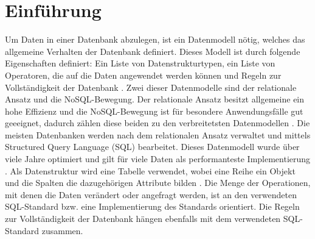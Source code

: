 
\chapter{Einführung} %

\label{Kaptiel1} %


\newcommand{\keyword}[1]{\textit{#1}}
\newcommand{\tabhead}[1]{\textbf{#1}}
\newcommand{\code}[1]{\texttt{#1}}
\newcommand{\file}[1]{\texttt{\bfseries#1}}
\newcommand{\option}[1]{\texttt{\itshape#1}}

Um Daten in einer Datenbank abzulegen, ist ein Datenmodell nötig, welches das allgemeine Verhalten der Datenbank definiert. Dieses Modell ist durch folgende Eigenschaften definiert: Ein Liste von Datenstrukturtypen, ein Liste von Operatoren, die auf die Daten angewendet werden können und Regeln zur Vollständigkeit der Datenbank \parencite{codd1981data}. Zwei dieser Datenmodelle sind der relationale Ansatz und die NoSQL-Bewegung. Der relationale Ansatz besitzt allgemeine ein hohe Effizienz und die NoSQL-Bewegung ist für besondere Anwendungsfälle gut geeeignet, dadurch zählen diese beiden zu den verbreitetsten Datenmodellen \parencite{vicknair2010comparison}. \newline
Die meisten Datenbanken werden nach dem relationalen Ansatz verwaltet und mittels Structured Query Language (SQL) bearbeitet. Dieses Datenmodell wurde über viele Jahre optimiert und gilt für viele Daten als performanteste Implementierung \parencite{miller2013graph}. Als Datenstruktur wird eine Tabelle verwendet, wobei eine Reihe ein Objekt  und die Spalten die dazugehörigen Attribute bilden \parencite{tatarinov2002storing}. Die Menge der Operationen, mit denen die Daten verändert oder angefragt werden, ist an den verwendeten SQL-Standard bzw. eine Implementierung des Standards orientiert. Die Regeln zur Vollständigkeit der Datenbank hängen ebenfalls mit dem verwendeten SQL-Standard zusammen.  \newline 
